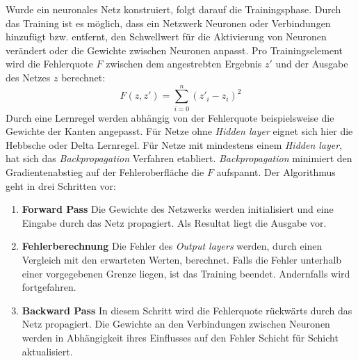 Wurde ein neuronales Netz konstruiert, folgt darauf die Trainingsphase. Durch das Training ist es möglich, dass ein Netzwerk Neuronen oder Verbindungen hinzufügt bzw. entfernt, den Schwellwert für die Aktivierung von Neuronen verändert oder die Gewichte zwischen Neuronen anpasst. Pro Trainingselement wird die Fehlerquote $F$ zwischen dem angestrebten Ergebnis $z'$ und der Ausgabe des Netzes $z$ berechnet:
$$ F(z, z')=\sum_{i=0}^{n}(z'_{i} - z_{i})^2 $$
Durch eine Lernregel werden abhängig von der Fehlerquote beispielsweise die Gewichte der Kanten angepasst. Für Netze ohne \textit{Hidden layer} eignet sich hier die Hebbsche oder Delta Lernregel. Für Netze mit mindestens einem \textit{Hidden layer}, hat sich das \textit{Backpropagation} Verfahren etabliert. \textit{Backpropagation} minimiert den Gradientenabstieg auf der Fehleroberfläche die $F$ aufspannt. Der Algorithmus geht in drei Schritten vor:

\begin{enumerate}
	\item \textbf{Forward Pass} Die Gewichte des Netzwerks werden initialisiert und eine Eingabe durch das Netz propagiert. Als Resultat liegt die Ausgabe vor.
	\item \textbf{Fehlerberechnung} Die Fehler des \textit{Output layers} werden, durch einen Vergleich mit den erwarteten Werten, berechnet. Falls die Fehler unterhalb einer vorgegebenen Grenze liegen, ist das Training beendet. Andernfalls wird fortgefahren.
	\item \textbf{Backward Pass} In diesem Schritt wird die Fehlerquote rückwärts durch das Netz propagiert. Die Gewichte an den Verbindungen zwischen Neuronen werden in Abhängigkeit ihres Einflusses auf den Fehler Schicht für Schicht aktualisiert.
\end{enumerate}


